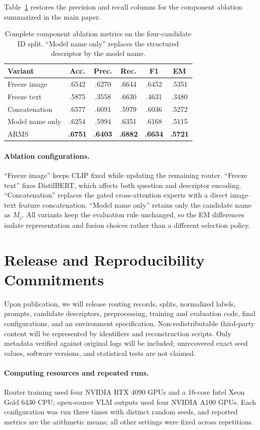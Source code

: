 \documentclass[letterpaper]{article}
\begin{document}
Table~\ref{tab:full-ablation} restores the precision and recall columns for the
component ablation summarized in the main paper.

\begin{table}[t]
\centering
\scriptsize
\setlength{\tabcolsep}{2.8pt}
\begin{tabular}{lccccc}
\toprule
Variant & Acc. & Prec. & Rec. & F1 & EM\\
\midrule
Freeze image
& .6542 & .6270 & .6644 & .6452 & .5351\\
Freeze text
& .5875 & .3558 & .6630 & .4631 & .3480\\
Concatenation
& .6577 & .6091 & .5979 & .6036 & .5272\\
Model name only
& .6254 & .5994 & .6351 & .6168 & .5115\\
ARMS
& \textbf{.6751} & \textbf{.6403} & \textbf{.6882}
& \textbf{.6634} & \textbf{.5721}\\
\bottomrule
\end{tabular}
\caption{Complete component ablation metrics on the four-candidate ID split.
``Model name only'' replaces the structured descriptor by the model name.}
\label{tab:full-ablation}
\end{table}

\paragraph{Ablation configurations.}
``Freeze image'' keeps CLIP fixed while updating the remaining router.
``Freeze text'' fixes DistilBERT, which affects both question and descriptor
encoding. ``Concatenation'' replaces the gated cross-attention experts with a
direct image--text feature concatenation. ``Model name only'' retains only the
candidate name as $M_j$. All variants keep the evaluation rule unchanged, so
the EM differences isolate representation and fusion choices rather than a
different selection policy.

\section{Release and Reproducibility Commitments}

Upon publication, we will release routing records, splits, normalized labels,
prompts, candidate descriptors, preprocessing, training and evaluation code,
final configurations, and an environment specification. Non-redistributable
third-party content will be represented by identifiers and reconstruction
scripts. Only metadata verified against original logs will be included;
unrecovered exact seed values, software versions, and statistical tests are not
claimed.

\paragraph{Computing resources and repeated runs.}
Router training used four NVIDIA RTX 4090 GPUs and a 16-core Intel Xeon Gold
6430 CPU; open-source VLM outputs used four NVIDIA A100 GPUs. Each configuration
was run three times with distinct random seeds, and reported metrics are the
arithmetic means; all other settings were fixed across repetitions.
\end{document}
